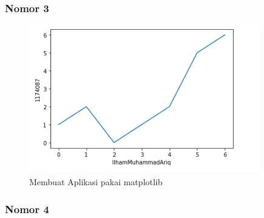 \subsubsection{Nomor 3}
\hfill\break

\begin{figure}[H]
\centerline{\includegraphics[width=10cm]{figures/1174087/3/7.png}}
\caption{Membuat Aplikasi pakai matplotlib}
\label{labelgambar}
\end{figure}

\subsubsection{Nomor 4}
\hfill\break

